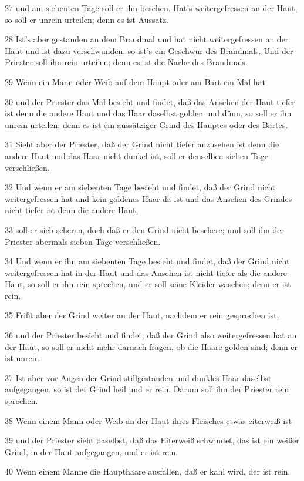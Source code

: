 \par 27 und am siebenten Tage soll er ihn besehen. Hat's weitergefressen an der Haut, so soll er unrein urteilen; denn es ist Aussatz.
\par 28 Ist's aber gestanden an dem Brandmal und hat nicht weitergefressen an der Haut und ist dazu verschwunden, so ist's ein Geschwür des Brandmals. Und der Priester soll ihn rein urteilen; denn es ist die Narbe des Brandmals.
\par 29 Wenn ein Mann oder Weib auf dem Haupt oder am Bart ein Mal hat
\par 30 und der Priester das Mal besieht und findet, daß das Ansehen der Haut tiefer ist denn die andere Haut und das Haar daselbst golden und dünn, so soll er ihn unrein urteilen; denn es ist ein aussätziger Grind des Hauptes oder des Bartes.
\par 31 Sieht aber der Priester, daß der Grind nicht tiefer anzusehen ist denn die andere Haut und das Haar nicht dunkel ist, soll er denselben sieben Tage verschließen.
\par 32 Und wenn er am siebenten Tage besieht und findet, daß der Grind nicht weitergefressen hat und kein goldenes Haar da ist und das Ansehen des Grindes nicht tiefer ist denn die andere Haut,
\par 33 soll er sich scheren, doch daß er den Grind nicht beschere; und soll ihn der Priester abermals sieben Tage verschließen.
\par 34 Und wenn er ihn am siebenten Tage besieht und findet, daß der Grind nicht weitergefressen hat in der Haut und das Ansehen ist nicht tiefer als die andere Haut, so soll er ihn rein sprechen, und er soll seine Kleider waschen; denn er ist rein.
\par 35 Frißt aber der Grind weiter an der Haut, nachdem er rein gesprochen ist,
\par 36 und der Priester besieht und findet, daß der Grind also weitergefressen hat an der Haut, so soll er nicht mehr darnach fragen, ob die Haare golden sind; denn er ist unrein.
\par 37 Ist aber vor Augen der Grind stillgestanden und dunkles Haar daselbst aufgegangen, so ist der Grind heil und er rein. Darum soll ihn der Priester rein sprechen.
\par 38 Wenn einem Mann oder Weib an der Haut ihres Fleisches etwas eiterweiß ist
\par 39 und der Priester sieht daselbst, daß das Eiterweiß schwindet, das ist ein weißer Grind, in der Haut aufgegangen, und er ist rein.
\par 40 Wenn einem Manne die Haupthaare ausfallen, daß er kahl wird, der ist rein.
